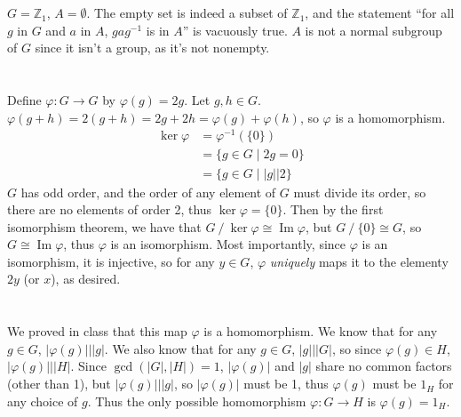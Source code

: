 \documentclass[11pt]{article}
\DeclareMathOperator{\im}{Im}
\begin{document}
\renewcommand{\thesubsection}{\thesection.\alph{subsection}}


\section{} %
$G=\mathbb{Z}_1$, $A=\emptyset$. The empty set is indeed a subset of
$\mathbb{Z}_1$, and the statement ``for all $g$ in $G$ and $a$ in $A$,
$gag^{-1}$ is in $A$'' is vacuously true. $A$ is not a normal subgroup of $G$
since it isn't a group, as it's not nonempty.


\section{} %
Define $\varphi:G\rightarrow G$ by $\varphi(g)=2g$. Let $g,h\in G$.
$\varphi(g+h)=2(g+h)=2g+2h=\varphi(g)+\varphi(h)$, so $\varphi$ is a
homomorphism.
\begin{align*}
	\ker\varphi&=\varphi^{-1}(\{0\})\\
	&=\{g\in G\mid2g=0\}\\
	&=\{g\in G\mid|g|\Big\vert2\}
\end{align*}
$G$ has odd order, and the order of any element of $G$ must divide its order,
so there are no elements of order 2, thus $\ker\varphi=\{0\}$. Then by the
first isomorphism theorem, we have that $G\mathbin/\ker\varphi\cong\im\varphi$,
but $G\mathbin/\{0\}\cong G$, so $G\cong\im\varphi$, thus $\varphi$ is an
isomorphism.
\newline
\newline
Most importantly, since $\varphi$ is an isomorphism, it is injective, so for
any $y\in G$, $\varphi$ \textit{uniquely} maps it to the elementy $2y$ (or $x$),
as desired.


\section{} %
\subsection{} %
We proved in class that this map $\varphi$ is a homomorphism. We know that for
any $g\in G$, $|\varphi(g)|\mathbin\Big\vert|g|$. We also know that for any
$g\in G$, $|g|\mathbin\Big\vert|G|$, so since $\varphi(g)\in H$,
$|\varphi(g)|\mathbin\Big\vert|H|$. Since $\gcd(|G|,|H|)=1$, $|\varphi(g)|$ and
$|g|$ share no common factors (other than 1), but
$|\varphi(g)|\mathbin\Big\vert|g|$, so $|\varphi(g)|$ must be 1, thus
$\varphi(g)$ must be $1_H$ for any choice of $g$. Thus the only possible
homomorphism $\varphi:G\rightarrow H$ is $\varphi(g)=1_H$.
\end{document}
